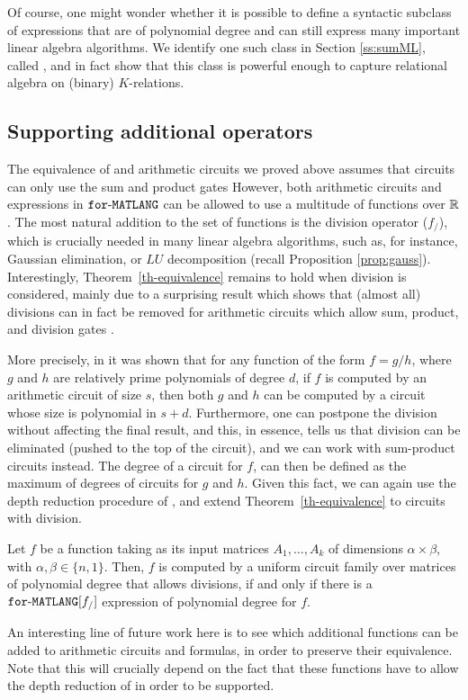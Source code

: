 Of course, one might wonder whether it is possible to define a syntactic subclass of \langfor expressions that are of polynomial degree and can still express many important linear algebra algorithms. We identify one such class in Section \ref{ss:sumML}, called \langsum, and in fact show that this class is powerful enough to capture relational algebra on (binary) $K$-relations. 


\subsection{Supporting additional operators}\label{subsec:additionalop}
The equivalence of \langfor and arithmetic circuits we proved above assumes that circuits can only use the sum and product gates 
However, both arithmetic circuits and expressions in $\texttt{for}\text{-}\texttt{MATLANG}$ can be allowed to use a multitude of functions over $\mathbb{R}$. The most natural addition to the set of functions is the division operator ($f_/$), which is crucially needed in many linear algebra algorithms, such as, for instance, Gaussian elimination, or $LU$ decomposition (recall Proposition \ref{prop:gauss}).
Interestingly, Theorem~\ref{th-equivalence} remains to hold when division is considered, mainly due to a surprising result which shows that (almost all) divisions can in fact be removed for arithmetic circuits which allow sum, product, and division gates \cite{allender}.

More precisely, in \cite{strassen1973vermeidung,borodin1982fast,kaltofen1988greatest} it was shown that for any function of the form $f = g/h$, where $g$ and $h$ are relatively prime polynomials of degree $d$, if $f$ is computed by an arithmetic circuit of size $s$, then both $g$ and $h$ can be computed by a circuit whose size is polynomial in $s + d$. Furthermore, one can postpone the division without affecting the final result, and this, in essence, tells us that division can be eliminated (pushed to the top of the circuit), and we can work with sum-product circuits instead. The degree of a circuit for $f$, can then be defined as the maximum of degrees of circuits for $g$ and $h$. Given this fact, we can again use the depth reduction procedure of \cite{AllenderJMV98}, and extend Theorem~\ref{th-equivalence} to circuits with division.
\begin{corollary}
\label{cor-division}
Let $f$ be a function taking as its input matrices $A_1,\ldots ,A_k$ of dimensions $\alpha\times \beta$, with $\alpha,\beta \in \{n,1\}$. Then, $f$ is computed by a uniform circuit family over matrices of polynomial degree that allows divisions, if and only if there is a $\texttt{for}\text{-}\texttt{MATLANG}[f_/]$ expression of polynomial degree for $f$.
\end{corollary}

An interesting line of future work here is to see which additional functions can be added to arithmetic circuits and \langfor formulas, in order to preserve their equivalence. Note that this will crucially depend on the fact that these functions have to allow the depth reduction of \cite{AllenderJMV98} in order to be supported.
